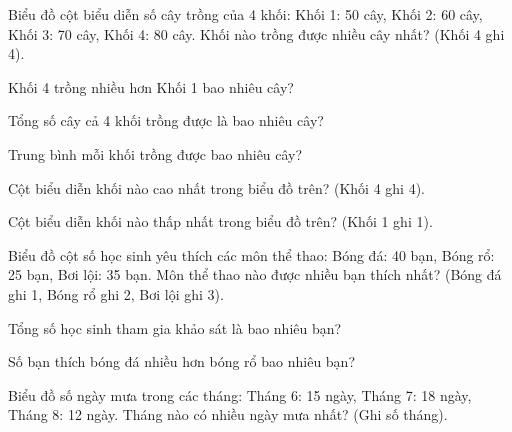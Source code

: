 \begin{ex}
Biểu đồ cột biểu diễn số cây trồng của 4 khối: Khối 1: 50 cây, Khối 2: 60 cây, Khối 3: 70 cây, Khối 4: 80 cây. Khối nào trồng được nhiều cây nhất? (Khối 4 ghi 4).
\end{ex}

\begin{ex}
Khối 4 trồng nhiều hơn Khối 1 bao nhiêu cây?
\end{ex}

\begin{ex}
Tổng số cây cả 4 khối trồng được là bao nhiêu cây?
\end{ex}

\begin{ex}
Trung bình mỗi khối trồng được bao nhiêu cây?
\end{ex}

\begin{ex}
Cột biểu diễn khối nào cao nhất trong biểu đồ trên? (Khối 4 ghi 4).
\end{ex}

\begin{ex}
Cột biểu diễn khối nào thấp nhất trong biểu đồ trên? (Khối 1 ghi 1).
\end{ex}

\begin{ex}
Biểu đồ cột số học sinh yêu thích các môn thể thao: Bóng đá: 40 bạn, Bóng rổ: 25 bạn, Bơi lội: 35 bạn. Môn thể thao nào được nhiều bạn thích nhất? (Bóng đá ghi 1, Bóng rổ ghi 2, Bơi lội ghi 3).
\end{ex}

\begin{ex}
Tổng số học sinh tham gia khảo sát là bao nhiêu bạn?
\end{ex}

\begin{ex}
Số bạn thích bóng đá nhiều hơn bóng rổ bao nhiêu bạn?
\end{ex}

\begin{ex}
Biểu đồ số ngày mưa trong các tháng: Tháng 6: 15 ngày, Tháng 7: 18 ngày, Tháng 8: 12 ngày. Tháng nào có nhiều ngày mưa nhất? (Ghi số tháng).
\end{ex}

